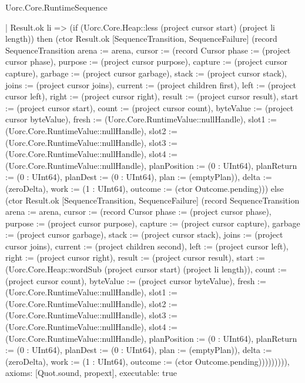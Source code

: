 \begin{lexlean}{Uorc.Core.RuntimeSequence}
\begin{semanticmodule}
{        | Result.ok li => (if (Uorc.Core.Heap::less (project cursor start) (project li length)) then (ctor Result.ok [SequenceTransition, SequenceFailure] (record SequenceTransition {arena := arena, cursor := (record Cursor {phase := (project cursor phase), purpose := (project cursor purpose), capture := (project cursor capture), garbage := (project cursor garbage), stack := (project cursor stack), joins := (project cursor joins), current := (project children first), left := (project cursor left), right := (project cursor right), result := (project cursor result), start := (project cursor start), count := (project cursor count), byteValue := (project cursor byteValue), fresh := (Uorc.Core.RuntimeValue::nullHandle), slot1 := (Uorc.Core.RuntimeValue::nullHandle), slot2 := (Uorc.Core.RuntimeValue::nullHandle), slot3 := (Uorc.Core.RuntimeValue::nullHandle), slot4 := (Uorc.Core.RuntimeValue::nullHandle), planPosition := (0 : UInt64), planReturn := (0 : UInt64), planDest := (0 : UInt64), plan := (emptyPlan)}), delta := (zeroDelta), work := (1 : UInt64), outcome := (ctor Outcome.pending)})) else (ctor Result.ok [SequenceTransition, SequenceFailure] (record SequenceTransition {arena := arena, cursor := (record Cursor {phase := (project cursor phase), purpose := (project cursor purpose), capture := (project cursor capture), garbage := (project cursor garbage), stack := (project cursor stack), joins := (project cursor joins), current := (project children second), left := (project cursor left), right := (project cursor right), result := (project cursor result), start := (Uorc.Core.Heap::wordSub (project cursor start) (project li length)), count := (project cursor count), byteValue := (project cursor byteValue), fresh := (Uorc.Core.RuntimeValue::nullHandle), slot1 := (Uorc.Core.RuntimeValue::nullHandle), slot2 := (Uorc.Core.RuntimeValue::nullHandle), slot3 := (Uorc.Core.RuntimeValue::nullHandle), slot4 := (Uorc.Core.RuntimeValue::nullHandle), planPosition := (0 : UInt64), planReturn := (0 : UInt64), planDest := (0 : UInt64), plan := (emptyPlan)}), delta := (zeroDelta), work := (1 : UInt64), outcome := (ctor Outcome.pending)})))))))),
  axioms: [Quot.sound, propext],
  executable: true
}


\end{semanticmodule}
\end{lexlean}

